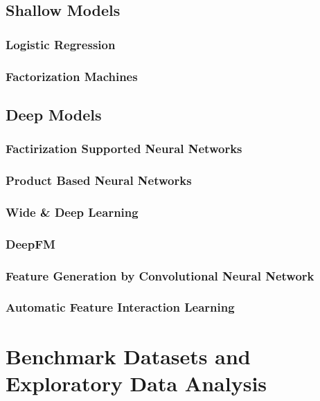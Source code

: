 \documentclass{mldsmsc}
\begin{document}
\subsection{Shallow Models}

\subsubsection{Logistic Regression}

\subsubsection{Factorization Machines}

\subsection{Deep Models}

\subsubsection{Factirization Supported Neural Networks}

\subsubsection{Product Based Neural Networks}

\subsubsection{Wide \& Deep Learning}

\subsubsection{DeepFM}

\subsubsection{Feature Generation by Convolutional Neural Network}

\subsubsection{Automatic Feature Interaction Learning}

\section{Benchmark Datasets and Exploratory Data Analysis}
\end{document}
